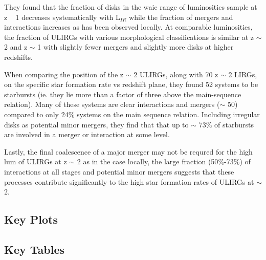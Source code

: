 \documentclass{article}
\begin{document}
They found that the fraction of disks in the waie range of luminosities sample at z ~ 1 decreases systematically with L$_{IR}$ while the fraction of mergers and interactions increases as has been observed locally. At comparable luminosities, the fraction of ULIRGs with various morphological classifications is similar at z $\sim$ 2 and z $\sim$ 1 with slightly fewer mergers and slightly more disks at higher redshifts.

When comparing the position of the z $\sim$ 2 ULIRGs, along with 70 z $\sim$ 2 LIRGs, on the specific star formation rate vs redshift plane, they found 52 systems to be starbursts (ie. they lie more than a factor of three above the main-sequence relation). Many of these systems are clear interactions and mergers ($\sim$ 50) compared to only 24$\%$ systems on the main sequence relation. Including irregular disks as potential minor mergers, they find that that up to $\sim$ 73$\%$ of starbursts are involved in a merger or interaction at some level.

Lastly, the final coalescence of a major merger may not be requred for the high lum of ULIRGs at z $\sim$ 2 as in the case locally, the large fraction (50$\%$-73$\%$) of interactions at all stages and potential minor mergers suggests that these processes contribute significantly to the high star formation rates of ULIRGs at $\sim$ 2.

\subsection{Key Plots}


\subsection{Key Tables}
\end{document}
